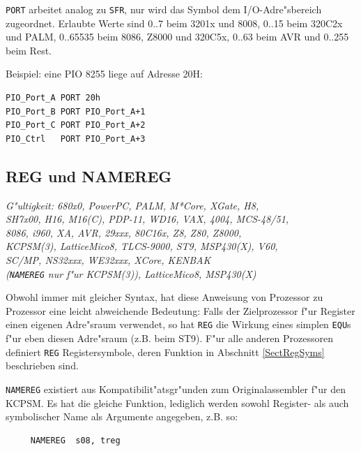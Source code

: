 \documentclass[12pt,a4paper,twoside]{report}
\makeatletter
\newcommand{\tty}[1]{{\tt #1}}
\newcommand{\ttindex}[1]{\index{#1@{\tt #1}}}
\makeatother
\begin{document}
\tty{PORT} arbeitet analog zu \tty{SFR}, nur wird das Symbol dem I/O-Adre"sbereich
zugeordnet.  Erlaubte Werte sind 0..7 beim 3201x und 8008, 0..15 beim 320C2x und PALM,
0..65535 beim 8086, Z8000 und 320C5x, 0..63 beim AVR und 0..255 beim Rest.
\par
Beispiel: eine PIO 8255 liege auf Adresse 20H:
\begin{verbatim}
PIO_Port_A PORT 20h
PIO_Port_B PORT PIO_Port_A+1
PIO_Port_C PORT PIO_Port_A+2
PIO_Ctrl   PORT PIO_Port_A+3
\end{verbatim}


\subsection{REG und NAMEREG}
\ttindex{REG}\ttindex{NAMEREG}

{\em G"ultigkeit: 680x0, PowerPC, PALM, M*Core, XGate, H8,\\
     SH7x00, H16, M16(C), PDP-11, WD16, VAX, 4004, MCS-48/51,\\
     8086, i960, XA, AVR, 29xxx,  80C16x, Z8, Z80, Z8000,\\
     KCPSM(3), LatticeMico8, TLCS-9000, ST9, MSP430(X), V60,\\
     SC/MP, NS32xxx, WE32xxx, XCore, KENBAK\\
     (\tty{NAMEREG} nur f"ur KCPSM(3)), LatticeMico8, MSP430(X)}

Obwohl immer mit gleicher Syntax, hat diese Anweisung von Prozessor
zu Prozessor eine leicht abweichende Bedeutung: Falls der Zielprozessor
f"ur Register einen eigenen Adre"sraum verwendet, so hat \tty{REG}
die Wirkung eines simplen \tty{EQU}s f"ur eben diesen Adre"sraum (z.B. beim
ST9).  F"ur alle anderen Prozessoren definiert \tty{REG} Registersymbole,
deren Funktion in Abschnitt \ref{SectRegSyms} beschrieben sind.

{\tt NAMEREG} existiert aus Kompatibilit"atsgr"unden zum Originalassembler
f"ur den KCPSM.  Es hat die gleiche Funktion, lediglich werden sowohl
Register- als auch symbolischer Name als Argumente angegeben, z.B. so:
\begin{verbatim}
     NAMEREG  s08, treg
\end{verbatim}
\end{document}
